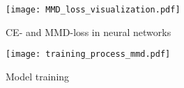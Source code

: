 \begin{figure}[H]
  \centering
  \texttt{[image: MMD\_loss\_visualization.pdf]}
  \caption {CE- and MMD-loss in neural networks} \label{fig:MMD_Loss_and_CE_loss}
\end{figure}

\begin{figure}[H]
  \centering
  \texttt{[image: training\_process\_mmd.pdf]}
  \caption {Model training} \label{fig:Training_Process_MMD}
\end{figure}

